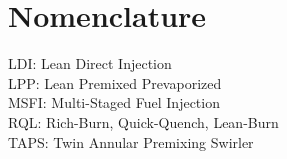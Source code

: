 \chapter*{Nomenclature}
    
LDI: Lean Direct Injection \\
LPP: Lean Premixed Prevaporized \\
MSFI: Multi-Staged Fuel Injection \\
RQL: Rich-Burn, Quick-Quench, Lean-Burn \\
TAPS: Twin Annular Premixing Swirler 
    